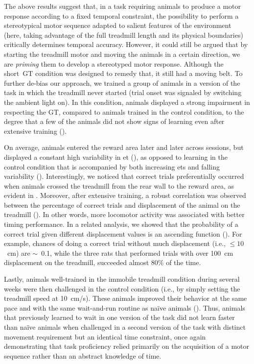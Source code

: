 The above results suggest that, in a task requiring animals to produce a motor response according to a fixed temporal constraint, the possibility to perform a stereotypical motor sequence adapted to salient features of the environment (here, taking advantage of the full treadmill length and its physical boundaries) critically determines temporal accuracy.
However, it could still be argued that by starting the treadmill motor and moving the animals in a certain direction, we are \textit{priming} them to develop a stereotyped motor response.
Although the short~GT condition was designed to remedy that, it still had a moving belt.
To further de-bias our approach, we trained a group of animals in a version of the task in which the treadmill never started (trial onset was signaled by switching the ambient light on).
In this condition, animals displayed a strong impairment in respecting the GT, compared to animals trained in the control condition, to the degree that a few of the animals did not show signs of learning even after extensive training ().

On average, animals entered the reward area later and later across sessions, but displayed a constant high variability in \gls{et} (), as opposed to learning in the control condition that is accompanied by both increasing \glspl{et} and falling variability ().
Interestingly, we noticed that correct trials preferentially occurred when animals crossed the treadmill from the rear wall to the reward area, as evident in .
Moreover, after extensive training, a robust correlation was observed between the percentage of correct trials and displacement of the animal on the treadmill ().
In other words, more locomotor activity was associated with better timing performance.
In a related analysis, we showed that the probability of a correct trial given different displacement values is an ascending function ().
For example, chances of doing a correct trial without much displacement (i.e., $\leq 10$~cm) are $\sim$~0.1, while the three rats that performed trials with over 100~cm displacement on the treadmill, succeeded almost 80\% of the time.
\par
Lastly, animals well-trained in the immobile treadmill condition during several weeks were then challenged in the control condition (i.e., by simply setting the treadmill speed at 10~cm/s).
These animals improved their behavior at the same pace and with the same wait-and-run routine as na\"ive animals ().
Thus, animals that previously learned to wait in one version of the task did not learn faster than na\"ive animals when challenged in a second version of the task with distinct movement requirement but an identical time constraint, once again demonstrating that task proficiency relied primarily on the acquisition of a motor sequence rather than an abstract knowledge of time.